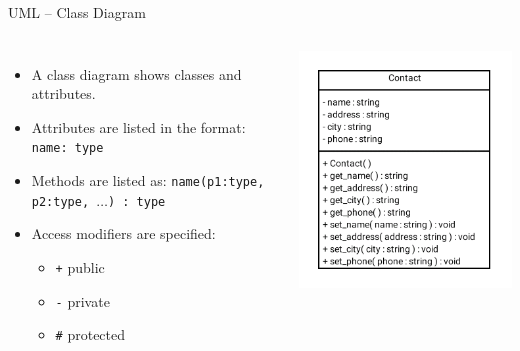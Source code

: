 \documentclass[]{beamer}
\begin{document}
\begin{frame}{UML -- Class Diagram}
    \begin{columns}
    \begin{itemize}[<+->]
        \item A class diagram shows classes and attributes.
        \item Attributes are listed in the format:
            \newline\texttt{name: type}
        \item Methods are listed as:
            \newline\texttt{name(p1:type, p2:type, $\ldots$) : type}
        \item Access modifiers are specified:
            \begin{itemize}
                \item \texttt{+} public
                \item \texttt{-} private
                \item \texttt{\#} protected
            \end{itemize}
    \end{itemize}
    \includegraphics[width=\textwidth]{images/uml-class}
    \end{columns}
\end{frame}
\end{document}
